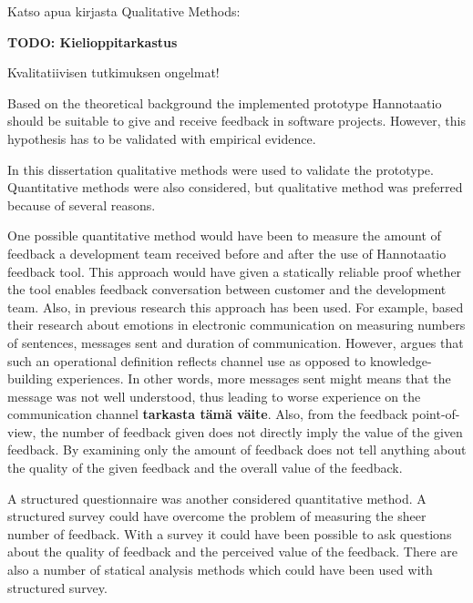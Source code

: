 \documentclass[english,12pt,a4paper,pdftex]{article}
\begin{document}
Katso apua kirjasta Qualitative Methods: \citep{gummesson1999}

\textbf{TODO: Kielioppitarkastus}

Kvalitatiivisen tutkimuksen ongelmat!

Based on the theoretical background the implemented prototype Hannotaatio should be suitable to give and receive feedback in software projects. However, this hypothesis has to be validated with empirical evidence. 

In this dissertation qualitative methods were used to validate the prototype. Quantitative methods were also considered, but qualitative method was preferred because of several reasons.

One possible quantitative method would have been to measure the amount of feedback a development team received before and after the use of Hannotaatio feedback tool. This approach would have given a statically reliable proof whether the tool enables feedback conversation between customer and the development team. Also, in previous research this approach has been used. For example, \citet{rice1987} based their research about emotions in electronic communication on measuring numbers of sentences, messages sent and duration of communication. However, \citet{carlson1999} argues that such an operational definition reflects channel use as opposed to knowledge-building experiences. In other words, more messages sent might means that the message was not well understood, thus leading to worse experience on the communication channel \textbf{tarkasta tämä väite}. Also, from the feedback point-of-view, the number of feedback given does not directly imply the value of the given feedback. By examining only the amount of feedback does not tell anything about the quality of the given feedback and the overall value of the feedback. 

A structured questionnaire was another considered quantitative method. A structured survey could have overcome the problem of measuring the sheer number of feedback. With a survey it could have been possible to ask questions about the quality of feedback and the perceived value of the feedback. There are also a number of statical analysis methods which could have been used with structured survey.
\end{document}
